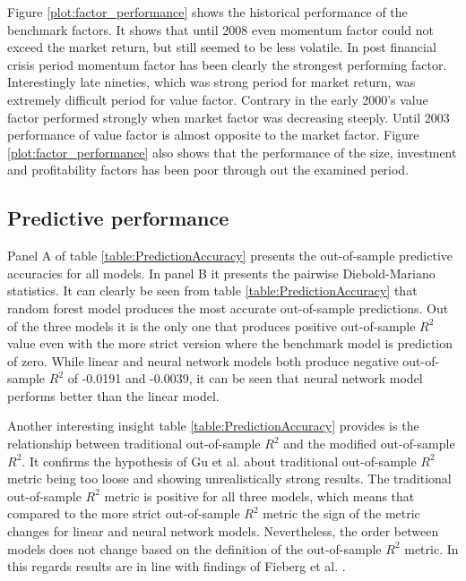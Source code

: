 \documentclass{article}
\begin{document}
Figure \ref{plot:factor_performance} shows the historical performance of the benchmark factors. It shows that until 2008 even momentum factor could not exceed the market return, but still seemed to be less volatile. In post financial crisis period momentum factor has been clearly the strongest performing factor. Interestingly late nineties, which was strong period for market return, was extremely difficult period for value factor. Contrary in the early 2000's value factor performed strongly when market factor was decreasing steeply. Until 2003 performance of value factor is almost opposite to the market factor. Figure \ref{plot:factor_performance} also shows that the performance of the size, investment and profitability factors has been poor through out the examined period.

\subsection{Predictive performance}\label{PredictivePerformance}

Panel A of table \ref{table:PredictionAccuracy} presents the out-of-sample predictive accuracies for all models. In panel B it presents the pairwise Diebold-Mariano statistics. It can clearly be seen from table \ref{table:PredictionAccuracy} that random forest model produces the most accurate out-of-sample predictions. Out of the three models it is the only one that produces positive out-of-sample $R^2$ value even with the more strict version where the benchmark model is prediction of zero. While linear and neural network models both produce negative out-of-sample $R^2$ of -0.0191 and -0.0039, it can be seen that neural network model performs better than the linear model. 

Another interesting insight table \ref{table:PredictionAccuracy} provides is the relationship between traditional out-of-sample $R^2$ and the modified out-of-sample $R^2$. It confirms the hypothesis of Gu et al. \citeyear{guetal} about traditional out-of-sample $R^2$ metric being too loose and showing unrealistically strong results. The  traditional out-of-sample $R^2$ metric is positive for all three models, which means that compared to the more strict out-of-sample $R^2$ metric the sign of the metric changes for linear and neural network models. Nevertheless, the order between models does not change based on the definition of the out-of-sample $R^2$ metric. In this regards results are in line with findings of Fieberg et al. \citeyear{Fieberg}.
\end{document}
